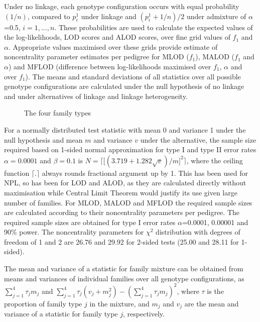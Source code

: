 Under no linkage, each genotype configuration occurs with equal probability
$(1/n)$, compared to $p_i^1$ under linkage and $(p_i^1+1/n)/2$ under admixture
of $\alpha$=0.5, $i=1, \ldots, n$.  These probabilities are used to calculate
the expected values of the log-likelihoods, LOD scores and ALOD scores, over
fine grid values of $f_1$ and $\alpha$.  Appropriate values maximised over
these grids provide estimate of noncentrality parameter estimates per pedigree
for MLOD ($f_1$), MALOD ($f_1$ and $\alpha$) and MFLOD (difference between
log-likelihoods maximised over $f_1$, $\alpha$ and over $f_1$).  The means and
standard deviations of all statistics over all possible genotype configurations
are calculated under the null hypothesis of no linkage and under alternatives
of linkage and linkage heterogeneity.

\begin{figure}[h]
\centering
{}
\caption{The four family types\label{f4}}
\end{figure}

For a normally distributed test statistic with mean 0 and variance 1 under the
null hypothesis and mean $m$ and variance $v$ under the alternative, the sample
size required based on 1-sided normal approximation for type I and type II
error rates $\alpha=0.0001$ and $\beta=0.1$ is $N=\lceil {[(3.719+1.282
\sqrt{v})}/{m}]^2\rceil$, where the ceiling function $\lceil.\rceil$ always
rounds fractional argument up by 1.  This has been used for NPL, so has been
for LOD and ALOD, as they are calculated directly without maximisation while
Central Limit Theorem would justify its use given large number of families.
For MLOD, MALOD and MFLOD the required sample sizes are calculated according to
their noncentrality parameters per pedigree.  The required sample sizes are
obtained for type I error rates $\alpha$=0.0001, 0.00001 and 90\% power.  The
noncentrality parameters for $\chi^2$ distribution with degrees of freedom of 1
and 2 are 26.76 and 29.92 for 2-sided tests (25.00 and 28.11 for 1-sided).


The mean and variance of a statistic for family mixture can be obtained from
means and variances of individual families over all genotype configurations, as
$\sum_{j=1}^4 \tau_j m_j$ and $\sum_{j=1}^4 \tau_j (v_j+m_j^2) - (\sum_{j=1}^4
\tau_j m_j)^2$, where $\tau$ is the proportion of family type $j$ in the
mixture, and $m_j$ and $v_j$ are the mean and variance of a statistic for
family type $j$, respectively.

